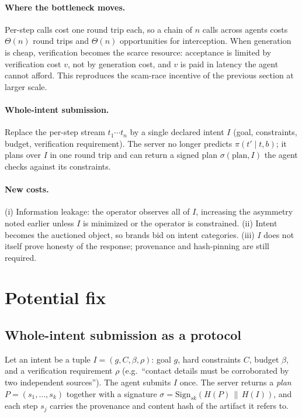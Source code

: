 \documentclass[11pt]{article}
\begin{document}
\paragraph{Where the bottleneck moves.} Per-step calls cost one round trip each, so a chain of $n$
calls across agents costs $\Theta(n)$ round trips and $\Theta(n)$ opportunities for interception.
When generation is cheap, verification becomes the scarce resource: acceptance is limited by
verification cost $v$, not by generation cost, and $v$ is paid in latency the agent cannot afford. This
reproduces the scam-race incentive of the previous section at larger scale.

\paragraph{Whole-intent submission.} Replace the per-step stream $t_1\cdots t_n$ by a single declared
intent $I$ (goal, constraints, budget, verification requirement). The server no longer predicts
$\pi(t'\mid t,b)$; it plans over $I$ in one round trip and can return a signed plan
$\sigma(\text{plan},I)$ the agent checks against its constraints.

\paragraph{New costs.} (i) Information leakage: the operator observes all of $I$, increasing the
asymmetry noted earlier unless $I$ is minimized or the operator is constrained. (ii) Intent becomes the
auctioned object, so brands bid on intent categories. (iii) $I$ does not itself prove honesty of the
response; provenance and hash-pinning are still required.

\section{Potential fix}
\subsection{Whole-intent submission as a protocol}
Let an intent be a tuple $I=(g,C,\beta,\rho)$: goal $g$, hard constraints $C$, budget $\beta$, and a
verification requirement $\rho$ (e.g.\ ``contact details must be corroborated by two independent
sources''). The agent submits $I$ once. The server returns a \emph{plan}
$P=(s_1,\dots,s_k)$ together with a signature $\sigma=\mathrm{Sign}_{sk}(H(P)\,\|\,H(I))$, and each
step $s_j$ carries the provenance and content hash of the artifact it refers to.
\end{document}

